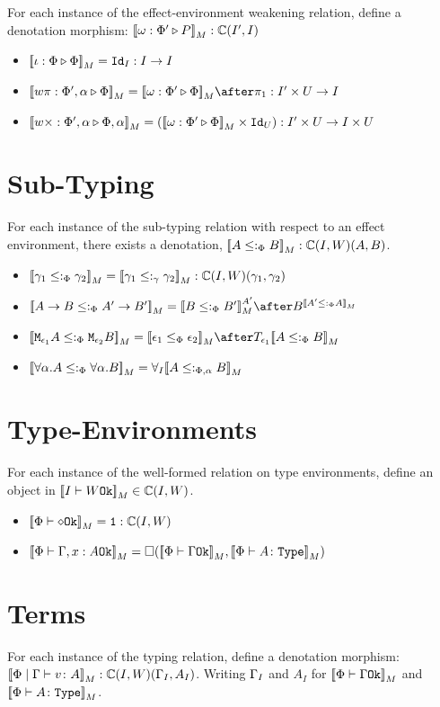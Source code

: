 \documentclass{report}
\begin{document}
For each instance of the effect-environment weakening relation, define a denotation morphism: ${\bf [\![}\omega : \Phi' \triangleright P{\bf ]\!]}_M: \mathbb{C}(I', I)$

\begin{itemize}
    \item ${\bf [\![}\iota : \Phi \triangleright \Phi{\bf ]\!]}_M = \texttt{Id}_{I}: I \rightarrow I$
    \item $\deno{\wrel{w\pi}{\P',\a}{\P}} = \deno{\wrelw{\P'}{\P}}\after \p: I'\times U\rightarrow I$
    \item ${\bf [\![}w\times : \Phi',\alpha \triangleright \Phi,\alpha{\bf ]\!]}_M = ({\bf [\![}\omega : \Phi' \triangleright \Phi{\bf ]\!]}_M\times \texttt{Id}_{U}): I'\times U\rightarrow I\times U$
\end{itemize}
\section{Sub-Typing}
For each instance of the sub-typing relation with respect  to an effect environment, there exists a denotation, ${\bf [\![}A\leq:_\Phi B{\bf ]\!]}_M: \mathbb{C}(I, W)(A, B)$.

\begin{itemize}
    \item ${\bf [\![}\gamma_1\leq:_\Phi \gamma_2{\bf ]\!]}_M = {\bf [\![}\gamma_1\leq:_\gamma \gamma_2{\bf ]\!]}_M : \mathbb{C}(I, W)(\gamma_1, \gamma_2)$
    \item $\deno{\ab \subtypep \fntype{A'}{B'}} = \deno{B\subtypep B'}^{A'}\after B^{\deno{A'\subtypep A}}$
    \item $\deno{\M{\e_1}{A}\subtypep\M{\e_2}{B}} = \deno{\e_1\subeffectp\e_2}\after\T{\e_1}{\deno{A\subtypep B}}$
    \item ${\bf [\![}\forall \alpha. A\leq:_\Phi\forall \alpha. B{\bf ]\!]}_M = \forall_I{{\bf [\![}A\leq:_{\Phi, \alpha} B{\bf ]\!]}_M}$
\end{itemize}
\section{Type-Environments}

For each instance of the well-formed relation on type environments, define an object in ${\bf [\![}I\vdash W \texttt{Ok}{\bf ]\!]}_M\in\mathbb{C}(I, W)$.

\begin{itemize}
    \item ${\bf [\![}\Phi\vdash \diamond \texttt{Ok}{\bf ]\!]}_M = \texttt{1}: \mathbb{C}(I, W)$
    \item ${\bf [\![}\Phi\vdash \Gamma, x: A \texttt{Ok}{\bf ]\!]}_M = \square({\bf [\![}\Phi\vdash \Gamma \texttt{Ok}{\bf ]\!]}_M, {\bf [\![}\Phi \vdash A \colon \texttt{Type}{\bf ]\!]}_M)$
\end{itemize}

\section{Terms}
For each instance of the typing relation, define a denotation morphism: ${\bf [\![}\Phi\mid\Gamma \vdash v \colon A{\bf ]\!]}_M: \mathbb{C}(I, W)(\Gamma_I, A_I)$. Writing $\Gamma_I$ and $A_I$ for ${\bf [\![}\Phi\vdash \Gamma \texttt{Ok}{\bf ]\!]}_M$ and ${\bf [\![}\Phi \vdash A \colon \texttt{Type}{\bf ]\!]}_M$.
\end{document}
